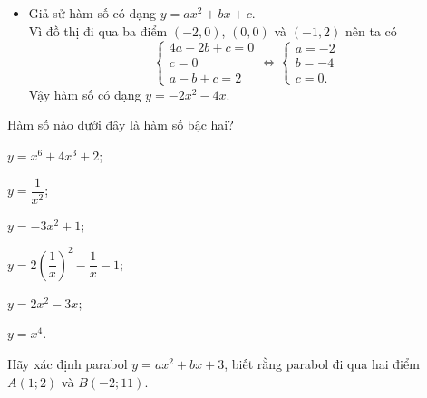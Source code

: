 \begin{bt}
{\begin{itemize}
			Vậy hàm số có dạng $y=x^2-2x-3$.
			\item[b)] Giả sử hàm số có dạng $y=ax^2+bx+c$.\\ 
			Vì đồ thị đi qua ba điểm $(-2{,}0)$, $(0{,}0)$ và $(-1{,}2)$ nên ta có
			\[\begin{cases} 4a-2b+c=0\\c=0\\a-b+c=2 \end{cases}
			\Leftrightarrow \begin{cases} a=-2\\b=-4\\c=0. \end{cases}\]
			Vậy hàm số có dạng $y=-2x^2-4x$.
		\end{itemize}
	}
\end{bt}

\begin{bt}%
	Hàm số nào dưới đây là hàm số bậc hai?
	\begin{listEX}[3]
\item $y=x^{6}+4 x^{3}+2$;
	\item $y=\dfrac{1}{x^{2}}$;
	\item $y=-3 x^{2}+1$;
	\item $y=2\left(\dfrac{1}{x}\right)^{2}- \dfrac{1}{x}-1$;
	\item $ y=2x^2-3x $;
	\item $ y=x^4$.
	\end{listEX}
\end{bt}

\begin{bt}%
	Hãy	xác định parabol $y=ax^2+bx+3$, biết rằng parabol đi qua hai điểm $A(1;2)$ và $B(-2;11)$.
\end{bt}


